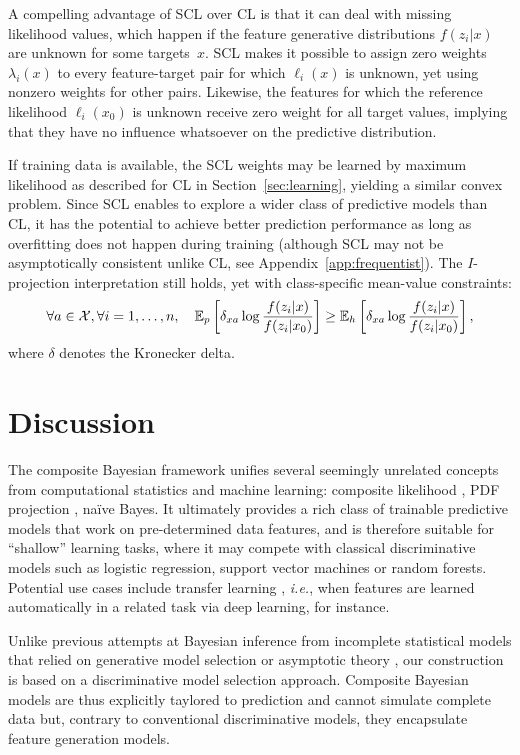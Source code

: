 \documentclass[english]{scrartcl}
\newcommand{\E}{\mathbb{E}}
\begin{document}
A compelling advantage of SCL over CL is that it can deal with missing likelihood values, which happen if the feature generative distributions $f(z_i|x)$ are unknown for some targets~$x$. SCL makes it possible to assign zero weights $\lambda_i(x)$ to every feature-target pair for which $\ell_i(x)$ is unknown, yet using nonzero weights for other pairs. Likewise, the features for which the reference likelihood $\ell_i(x_0)$ is unknown receive zero weight for all target values, implying that they have no influence whatsoever on the predictive distribution.

If training data is available, the SCL weights may be learned by maximum likelihood as described for CL in Section~\ref{sec:learning}, yielding a similar convex problem. Since SCL enables to explore a wider class of predictive models than CL, it has the potential to achieve better prediction performance as long as overfitting does not happen during training (although SCL may not be asymptotically consistent unlike CL, see Appendix~\ref{app:frequentist}). The $I$-projection interpretation still holds, yet with class-specific mean-value constraints:
$$
\forall a\in{\cal X}, \forall i=1,\ldots,n,
\quad
\E_p\left[\delta_{xa}\log \frac{f(z_i|x)}{f(z_i|x_0)}\right]
\geq \E_h\left[\delta_{xa}\log \frac{f(z_i|x)}{f(z_i|x_0)}\right],
$$
where $\delta$ denotes the Kronecker delta. 




\section{Discussion}
\label{sec:discussion}

The composite Bayesian framework unifies several seemingly unrelated concepts from computational statistics and machine learning: composite likelihood \cite{Varin-11}, PDF projection \cite{Baggenstoss-03}, na\"ive Bayes. It ultimately provides a rich class of trainable predictive models that work on pre-determined data features, and is therefore suitable for ``shallow'' learning tasks, where it may compete with classical discriminative models such as logistic regression, support vector machines or random forests. Potential use cases include transfer learning \cite{Goodfellow-16}, {\em i.e.}, when features are learned automatically in a related task via deep learning, for instance.

Unlike previous attempts at Bayesian inference from incomplete statistical models that relied on generative model selection \cite{Yuan-99b,Wang-14} or asymptotic theory \cite{Pauli-11,Ribatet-12}, our construction is based on a discriminative model selection approach. Composite Bayesian models are thus explicitly taylored to prediction and cannot simulate complete data but, contrary to conventional discriminative models, they encapsulate feature generation models.
\end{document}
